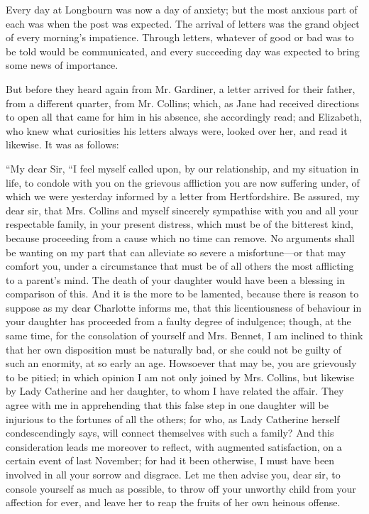 Every day at Longbourn was now a day of anxiety; but the most anxious part of each was when the post was expected. The arrival of letters was the grand object of every morning's impatience. Through letters, whatever of good or bad was to be told would be communicated, and every succeeding day was expected to bring some news of importance.

But before they heard again from Mr. Gardiner, a letter arrived for their father, from a different quarter, from Mr. Collins; which, as Jane had received directions to open all that came for him in his absence, she accordingly read; and Elizabeth, who knew what curiosities his letters always were, looked over her, and read it likewise. It was as follows:

“My dear Sir,\crlf
“I feel myself called upon, by our relationship, and my situation in life, to condole with you on the grievous affliction you are now suffering under, of which we were yesterday informed by a letter from Hertfordshire. Be assured, my dear sir, that Mrs. Collins and myself sincerely sympathise with you and all your respectable family, in your present distress, which must be of the bitterest kind, because proceeding from a cause which no time can remove. No arguments shall be wanting on my part that can alleviate so severe a misfortune---or that may comfort you, under a circumstance that must be of all others the most afflicting to a parent's mind. The death of your daughter would have been a blessing in comparison of this. And it is the more to be lamented, because there is reason to suppose as my dear Charlotte informs me, that this licentiousness of behaviour in your daughter has proceeded from a faulty degree of indulgence; though, at the same time, for the consolation of yourself and Mrs. Bennet, I am inclined to think that her own disposition must be naturally bad, or she could not be guilty of such an enormity, at so early an age. Howsoever that may be, you are grievously to be pitied; in which opinion I am not only joined by Mrs. Collins, but likewise by Lady Catherine and her daughter, to whom I have related the affair. They agree with me in apprehending that this false step in one daughter will be injurious to the fortunes of all the others; for who, as Lady Catherine herself condescendingly says, will connect themselves with such a family? And this consideration leads me moreover to reflect, with augmented satisfaction, on a certain event of last November; for had it been otherwise, I must have been involved in all your sorrow and disgrace. Let me then advise you, dear sir, to console yourself as much as possible, to throw off your unworthy child from your affection for ever, and leave her to reap the fruits of her own heinous offense.

